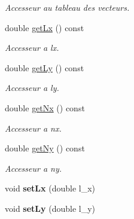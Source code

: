 \begin{DoxyCompactItemize}
\begin{DoxyCompactList}\small\item\em Accesseur au tableau des vecteurs. \end{DoxyCompactList}\item 
\hypertarget{classHeight_a483c8bc6157331b43069cff8149d88f1}{double \hyperlink{classHeight_a483c8bc6157331b43069cff8149d88f1}{get\-Lx} () const }\label{classHeight_a483c8bc6157331b43069cff8149d88f1}

\begin{DoxyCompactList}\small\item\em Accesseur a lx. \end{DoxyCompactList}\item 
\hypertarget{classHeight_aff1fa60b41395a3e55b87bb75082d50d}{double \hyperlink{classHeight_aff1fa60b41395a3e55b87bb75082d50d}{get\-Ly} () const }\label{classHeight_aff1fa60b41395a3e55b87bb75082d50d}

\begin{DoxyCompactList}\small\item\em Accesseur a ly. \end{DoxyCompactList}\item 
\hypertarget{classHeight_a29aae8ffba5cbf9262b0dbbf09ffe37d}{double \hyperlink{classHeight_a29aae8ffba5cbf9262b0dbbf09ffe37d}{get\-Nx} () const }\label{classHeight_a29aae8ffba5cbf9262b0dbbf09ffe37d}

\begin{DoxyCompactList}\small\item\em Accesseur a nx. \end{DoxyCompactList}\item 
\hypertarget{classHeight_acb97ec45437cf773f7d2256545c05f03}{double \hyperlink{classHeight_acb97ec45437cf773f7d2256545c05f03}{get\-Ny} () const }\label{classHeight_acb97ec45437cf773f7d2256545c05f03}

\begin{DoxyCompactList}\small\item\em Accesseur a ny. \end{DoxyCompactList}\item 
\hypertarget{classHeight_ac1f6dd58c6445abd25acec345eff1dad}{void {\bfseries set\-Lx} (double l\-\_\-x)}\label{classHeight_ac1f6dd58c6445abd25acec345eff1dad}

\item 
\hypertarget{classHeight_aba395aecd1274c86136e2b971bcde78a}{void {\bfseries set\-Ly} (double l\-\_\-y)}\label{classHeight_aba395aecd1274c86136e2b971bcde78a}


\end{DoxyCompactItemize}
